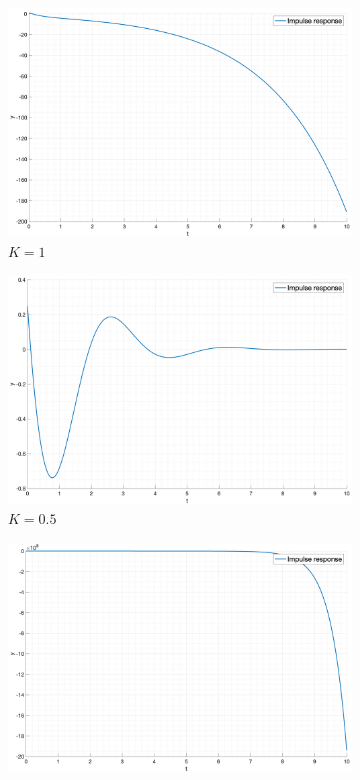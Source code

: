 \begin{figure}[ht!]
    \begin{subfigure}{0.5\textwidth}
        \centering
        \includegraphics[width=\textwidth]{media/plots/task4_impulse_response_closed_1.png}
        \caption{$K = 1$}
    \end{subfigure}%
    \begin{subfigure}{0.5\textwidth}
        \centering
        \includegraphics[width=\textwidth]{media/plots/task4_impulse_response_closed_2.png}
        \caption{$K = 0.5$}
    \end{subfigure}
    \begin{subfigure}{0.5\textwidth}
        \centering
        \includegraphics[width=\textwidth]{media/plots/task4_impulse_response_closed_3.png}

\end{subfigure}
\end{figure}
